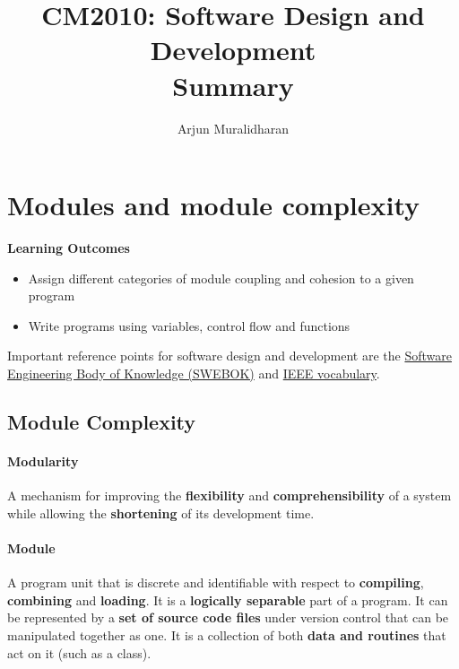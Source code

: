 \title{CM2010: Software Design and Development \\ Summary}
\author{Arjun Muralidharan}




\section{Modules and module complexity}
\begin{mdframed}
\textbf{Learning Outcomes}
\begin{itemize}[label={\checkmark}]
\item Assign different categories of module coupling and cohesion to a given program
\item Write programs using variables, control flow and functions
\end{itemize}
\end{mdframed}

Important reference points for software design and development are the \href{https://ieeexplore.ieee.org/document/6816804}{Software Engineering Body of Knowledge (SWEBOK)} and \href{https://ieeexplore.ieee.org/document/5733835}{IEEE vocabulary}.

\subsection{Module Complexity}
\paragraph{Modularity} %
\label{par:modularity}
A mechanism for improving the \textbf{flexibility} and \textbf{comprehensibility} of a system while allowing the \textbf{shortening} of its development time.

\paragraph{Module} %
\label{par:module}
A program unit that is discrete and identifiable with respect to \textbf{compiling}, \textbf{combining} and \textbf{loading}. It is a \textbf{logically separable} part of a program. It can be represented by a \textbf{set of source code files} under version control that can be manipulated together as one. It is a collection of both \textbf{data and routines} that act on it (such as a class).



